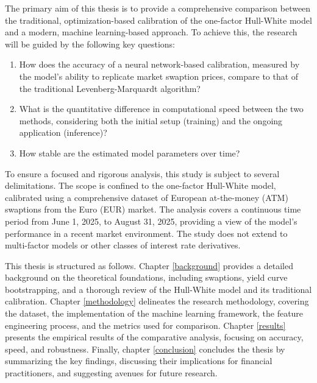 The primary aim of this thesis is to provide a comprehensive comparison between the traditional, optimization-based calibration of the one-factor Hull-White model and a modern, machine learning-based approach. To achieve this, the research will be guided by the following key questions:
\begin{enumerate}
    \item How does the accuracy of a neural network-based calibration, measured by the model's ability to replicate market swaption prices, compare to that of the traditional Levenberg-Marquardt algorithm?
    \item What is the quantitative difference in computational speed between the two methods, considering both the initial setup (training) and the ongoing application (inference)?
    \item How stable are the estimated model parameters over time?
\end{enumerate}

To ensure a focused and rigorous analysis, this study is subject to several delimitations. The scope is confined to the one-factor Hull-White model, calibrated using a comprehensive dataset of European at-the-money (ATM) swaptions from the Euro (EUR) market. The analysis covers a continuous time period from June 1, 2025, to August 31, 2025, providing a view of the model's performance in a recent market environment. The study does not extend to multi-factor models or other classes of interest rate derivatives.

This thesis is structured as follows. Chapter \ref{background} provides a detailed background on the theoretical foundations, including swaptions, yield curve bootstrapping, and a thorough review of the Hull-White model and its traditional calibration. Chapter \ref{methodology} delineates the research methodology, covering the dataset, the implementation of the machine learning framework, the feature engineering process, and the metrics used for comparison. Chapter \ref{results} presents the empirical results of the comparative analysis, focusing on accuracy, speed, and robustness. Finally, chapter \ref{conclusion} concludes the thesis by summarizing the key findings, discussing their implications for financial practitioners, and suggesting avenues for future research.